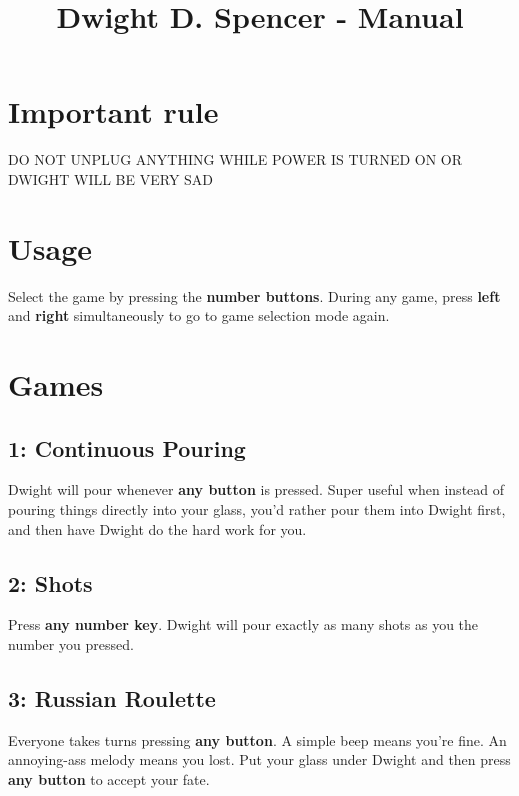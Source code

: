 

\usepackage{geometry}



\title{Dwight D. Spencer - Manual}
\date{}
\maketitle
\vspace{-1cm}

\section*{Important rule}
DO NOT UNPLUG ANYTHING WHILE POWER IS TURNED ON OR DWIGHT WILL BE VERY SAD

\section*{Usage}
Select the game by pressing the \textbf{number buttons}.
During any game, press \textbf{left} and \textbf{right} simultaneously to go to game selection mode again.

\section*{Games}
\subsection*{1: Continuous Pouring}
Dwight will pour whenever \textbf{any button} is pressed. Super useful when instead of pouring things directly into your glass, you'd rather pour them into Dwight first, and then have Dwight do the hard work for you.

\subsection*{2: Shots}
Press \textbf{any number key}. Dwight will pour exactly as many shots as you the number you pressed.

\subsection*{3: Russian Roulette}
Everyone takes turns pressing \textbf{any button}.
A simple beep means you're fine. An annoying-ass melody means you lost. Put your glass under Dwight and then press \textbf{any button} to accept your fate.

